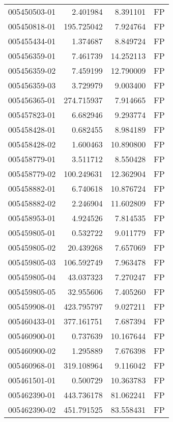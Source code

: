 \begin{tabular}{lrrl}
005450503-01 &    2.401984 &       8.391101 &   FP \\
005450818-01 &  195.725042 &       7.924764 &   FP \\
005455434-01 &    1.374687 &       8.849724 &   FP \\
005456359-01 &    7.461739 &      14.252113 &   FP \\
005456359-02 &    7.459199 &      12.790009 &   FP \\
005456359-03 &    3.729979 &       9.003400 &   FP \\
005456365-01 &  274.715937 &       7.914665 &   FP \\
005457823-01 &    6.682946 &       9.293774 &   FP \\
005458428-01 &    0.682455 &       8.984189 &   FP \\
005458428-02 &    1.600463 &      10.890800 &   FP \\
005458779-01 &    3.511712 &       8.550428 &   FP \\
005458779-02 &  100.249631 &      12.362904 &   FP \\
005458882-01 &    6.740618 &      10.876724 &   FP \\
005458882-02 &    2.246904 &      11.602809 &   FP \\
005458953-01 &    4.924526 &       7.814535 &   FP \\
005459805-01 &    0.532722 &       9.011779 &   FP \\
005459805-02 &   20.439268 &       7.657069 &   FP \\
005459805-03 &  106.592749 &       7.963478 &   FP \\
005459805-04 &   43.037323 &       7.270247 &   FP \\
005459805-05 &   32.955606 &       7.405260 &   FP \\
005459908-01 &  423.795797 &       9.027211 &   FP \\
005460433-01 &  377.161751 &       7.687394 &   FP \\
005460900-01 &    0.737639 &      10.167644 &   FP \\
005460900-02 &    1.295889 &       7.676398 &   FP \\
005460968-01 &  319.108964 &       9.116042 &   FP \\
005461501-01 &    0.500729 &      10.363783 &   FP \\
005462390-01 &  443.736178 &      81.062241 &   FP \\
005462390-02 &  451.791525 &      83.558431 &   FP \\

\end{tabular}

